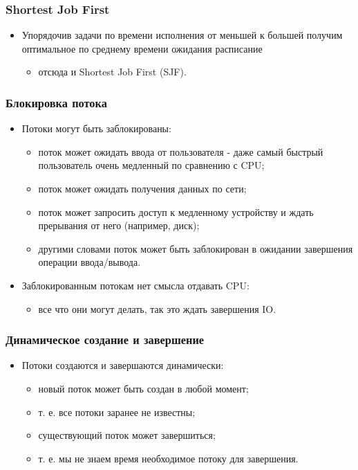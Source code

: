 \begin{frame}
\frametitle{Shortest Job First}
\begin{itemize}
  \item Упорядочив задачи по времени исполнения от меньшей к большей получим
  оптимальное по среднему времени ожидания расписание
  \begin{itemize}
    \item отсюда и Shortest Job First (SJF).
  \end{itemize}
\end{itemize}
\end{frame}

\begin{frame}
\frametitle{Блокировка потока}
\begin{itemize}
  \item Потоки могут быть заблокированы:
  \begin{itemize}
    \item поток может ожидать ввода от пользователя - даже самый быстрый
    пользователь очень медленный по сравнению с CPU;
    \item поток может ожидать получения данных по сети;
    \item поток может запросить доступ к медленному устройству и ждать
    прерывания от него (например, диск);
    \item другими словами поток может быть заблокирован в ожидании завершения
    операции ввода/вывода.
  \end{itemize}
  \item Заблокированным потокам нет смысла отдавать CPU:
  \begin{itemize}
    \item все что они могут делать, так это ждать завершения IO.
  \end{itemize}
\end{itemize}
\end{frame}

\begin{frame}
\frametitle{Динамическое создание и завершение}
\begin{itemize}
  \item Потоки создаются и завершаются динамически:
  \begin{itemize}
    \item новый поток может быть создан в любой момент;
    \item т. е. все потоки заранее не известны;
    \item существующий поток может завершиться;
    \item т. е. мы не знаем время необходимое потоку для завершения.
  \end{itemize}
\end{itemize}
\end{frame}

